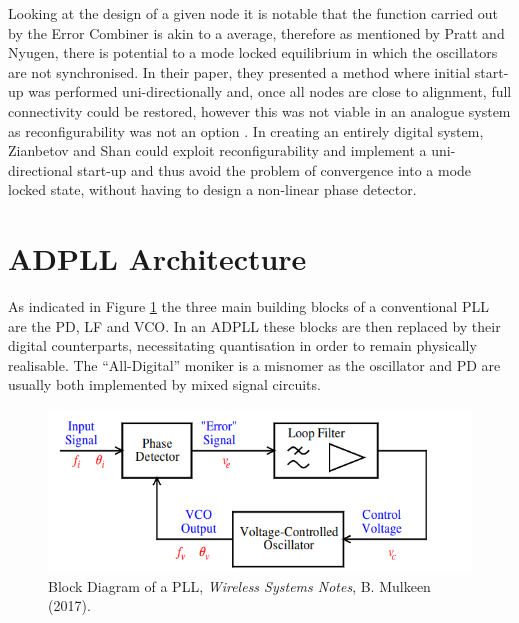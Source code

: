 Looking at the design of a given node it is notable that the function carried out by the Error Combiner is akin to a average, therefore as mentioned by Pratt and Nyugen, there is potential to a mode locked equilibrium in which the oscillators are not synchronised. In their paper, they presented a method where initial start-up was performed uni-directionally and, once all nodes are close to alignment, full connectivity could be restored, however this was not viable in an analogue system as reconfigurability was not an option \cite{pratt1995distributed}. In creating an entirely digital system, Zianbetov and Shan could exploit reconfigurability and implement a uni-directional start-up and thus avoid the problem of convergence into a mode locked state, without having to design a non-linear phase detector.

\section{\acl{ADPLL} Architecture}
As indicated in Figure \ref{fig:mulkeen_pll} the three main building blocks of a conventional \ac{PLL} are the \ac{PD}, \ac{LF} and \ac{VCO}. In an \ac{ADPLL} these blocks are then replaced by their digital counterparts, necessitating quantisation in order to remain physically realisable. The ``All-Digital'' moniker is a misnomer as the oscillator and \acl{PD} are usually both implemented by mixed signal circuits.
\begin{figure}[h]
	\centering
	\includegraphics[scale=0.5]{../tex_files/mulkeen_pll}
	\caption{Block Diagram of a \acl{PLL}, \textit{Wireless Systems Notes}, B. Mulkeen (2017).}
	\label{fig:mulkeen_pll}
\end{figure}


